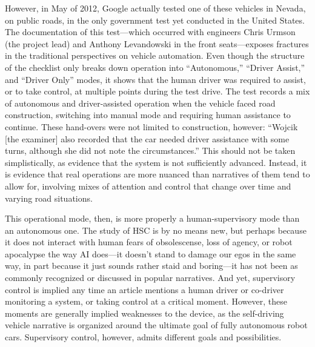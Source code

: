 However, in May of 2012,
Google actually tested one of these vehicles in Nevada, on public
roads, in the only government test yet conducted in the United States.
The documentation of this test---which occurred with engineers Chris
Urmson (the project lead) and Anthony Levandowski in the front
seats---exposes fractures in the traditional perspectives on vehicle
automation.\cite{harrisNevada} Even though the structure of the
checklist only breaks down operation into ``Autonomous,'' ``Driver
Assist,'' and ``Driver Only'' modes, it shows that the human driver
was required to assist, or to take control, at multiple points during
the test drive. The test records a mix of autonomous and
driver-assisted operation when the vehicle faced road construction,
switching into manual mode and requiring human assistance to continue.
These hand-overs were not limited to construction, however: 
``Wojcik [the examiner] also recorded that the car needed driver
assistance with some turns, although she did not note the
circumstances.''\cite{harrisNevada} This should not be taken
simplistically, as evidence that the system is not sufficiently
advanced. Instead, it is evidence that real operations are more
nuanced than narratives of them tend to allow for, involving mixes of
attention and control that change over time and varying road situations.

This operational mode, then, is more properly a human-supervisory mode
than an autonomous one. The study of HSC is by no means new, but
perhaps because it does not interact with human fears of obsolescense,
loss of agency, or robot apocalypse the way AI does---it doesn't stand
to damage our egos in the same way, in part because it just
sounds rather staid and boring---it has not been as commonly
recognized or discussed in popular narratives. And yet, supervisory
control is implied any time an article mentions a human driver or
co-driver monitoring a system, or taking control at a critical moment.
However, these moments are generally implied weaknesses to the device,
as the self-driving vehicle narrative is organized around the ultimate
goal of fully autonomous robot cars. Supervisory control, however,
admits different goals and possibilities.


